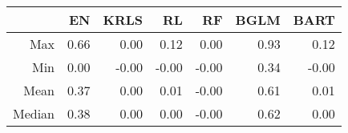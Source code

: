 \begin{table}[ht]
\centering
\begin{tabular}{rrrrrrr}
  \hline
 & EN & KRLS & RL & RF & BGLM & BART \\ 
  \hline
Max & 0.66 & 0.00 & 0.12 & 0.00 & 0.93 & 0.12 \\ 
  Min & 0.00 & -0.00 & -0.00 & -0.00 & 0.34 & -0.00 \\ 
  Mean & 0.37 & 0.00 & 0.01 & -0.00 & 0.61 & 0.01 \\ 
  Median & 0.38 & 0.00 & 0.00 & -0.00 & 0.62 & 0.00 \\ 
   \hline
\end{tabular}
\end{table}
